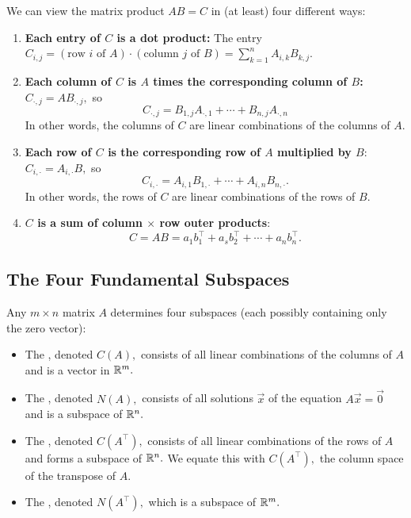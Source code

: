 \documentclass{article}
\begin{document}
\begin{remark}
We can view the matrix product $AB = C$ in (at least) four different ways:

\begin{enumerate}
	\item \textbf{Each entry of $C$ is a dot product:} The \@{entry} $C_{i,j} = (\text{row } i \text{ of } A) \cdot (\text{column } j \text{ of } B) = \sum_{k=1}^n A_{i,k} B_{k,j}.$
	\item \textbf{Each column of $C$ is $A$ times the corresponding column of $B$:} $C_{\cdot, j} = A B_{\cdot, j},$ so
		\[ C_{\cdot, j} = B_{1,j} A_{\cdot, 1} + \cdots + B_{n,j} A_{\cdot, n} \]
		In other words, the columns of $C$ are \@{linear combinations} of the columns of $A.$
	\item \textbf{Each row of $C$ is the corresponding row of $A$ multiplied by $B:$} $C_{i, \cdot} = A_{i, \cdot} B,$ so
		\[ C_{i, \cdot} = A_{i,1}B_{1, \cdot} + \cdots + A_{i,n} B_{n, \cdot}. \]
		In other words, the rows of $C$ are \@{linear combinations} of the rows of $B.$
	\item \textbf{$C$ is a sum of column $\times$ row outer products}:
		\[ C = AB = a_1 b_1^\top + a_s b_2^\top + \cdots + a_n b_n^\top. \]
\end{enumerate}
\end{remark}

\subsection{The Four Fundamental Subspaces}

\begin{definition}
	Any $m \times n$ \@{matrix} $A$ determines four \@{subspaces} (each possibly containing only the zero vector):

	\begin{itemize}
		\item The , denoted $C(A),$ consists of all \@{linear combinations} of the columns of $A$ and is a \@{vector} in $\mathbb{R}^m.$
		\item The , denoted $N(A),$ consists of all solutions $\vec{x}$ of the equation $A \vec{x} = \vec{0}$ and is a subspace of $\mathbb{R}^n.$
		\item The , denoted $C(A^\top),$ consists of all \@{linear combinations} of the rows of $A$ and forms a subspace of $\mathbb{R}^n.$ We equate this with $C(A^\top),$ the column space of the \@{transpose} of $A$.
		\item The , denoted $N(A^\top),$ which is a subspace of $\mathbb{R}^m.$ 
	\end{itemize}
\end{definition}
\end{document}
